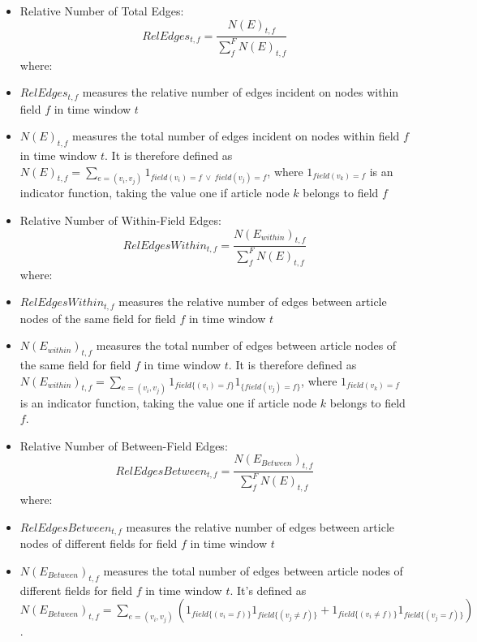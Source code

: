 \documentclass[
]{article}
\begin{document}
\begin{itemize}
\item
  Relative Number of Total Edges: \begin{equation}
  RelEdges_{t,f} = \frac{N(E)_{t,f}}{\sum_f^F N(E)_{t,f}} 
  \end{equation} where:
\item
  \(RelEdges_{t,f}\) measures the relative number of edges incident on
  nodes within field \(f\) in time window \(t\)
\item
  \(N(E)_{t,f}\) measures the total number of edges incident on nodes
  within field \(f\) in time window \(t\). It is therefore defined as
  \(N(E)_{t,f} = \sum_{e=(v_i,v_j)} 1_{field(v_i)=f \: \vee \: field(v_j) = f}\),
  where \(1_{field(v_k)=f}\) is an indicator function, taking the value
  one if article node \(k\) belongs to field \(f\)
\item
  Relative Number of Within-Field Edges: \begin{equation}
  RelEdgesWithin_{t,f} = \frac{N(E_{within})_{t,f}}{\sum_f^F N(E)_{t,f}} 
  \end{equation} where:
\item
  \(RelEdgesWithin_{t,f}\) measures the relative number of edges between
  article nodes of the same field for field \(f\) in time window \(t\)
\item
  \(N(E_{within})_{t,f}\) measures the total number of edges between
  article nodes of the same field for field \(f\) in time window \(t\).
  It is therefore defined as
  \(N(E_{within})_{t,f} = \sum_{e=(v_i,v_j)} 1_{field\{(v_i)=f\}} 1_{\{field(v_j) = f\}}\),
  where \(1_{field(v_k)=f}\) is an indicator function, taking the value
  one if article node \(k\) belongs to field \(f\).
\item
  Relative Number of Between-Field Edges: \begin{equation}
  RelEdgesBetween_{t,f} = \frac{N(E_{Between})_{t,f}}{\sum_f^F N(E)_{t,f}} 
  \end{equation} where:
\item
  \(RelEdgesBetween_{t,f}\) measures the relative number of edges
  between article nodes of different fields for field \(f\) in time
  window \(t\)
\item
  \(N(E_{Between})_{t,f}\) measures the total number of edges between
  article nodes of different fields for field \(f\) in time window
  \(t\). It's defined as
  \(N(E_{Between})_{t,f} = \sum_{e=(v_i,v_j)} \left ( 1_{field\{(v_i=f)\}} 1_{field\{(v_j \neq f)\}} + 1_{field\{(v_i \neq f)\}} 1_{field\{(v_j = f)\}}  \right )\).
\end{itemize}
\end{document}
